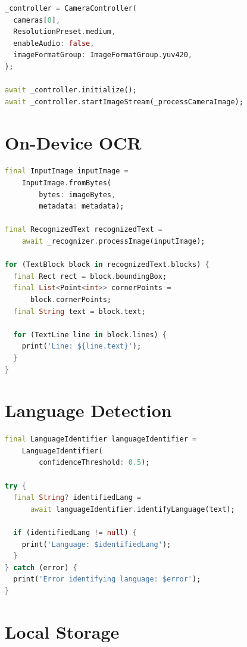 \documentclass[12pt,a4paper]{report}
\begin{document}
\begin{lstlisting}[language=Dart]
_controller = CameraController(
  cameras[0],
  ResolutionPreset.medium,
  enableAudio: false,
  imageFormatGroup: ImageFormatGroup.yuv420,
);

await _controller.initialize();
await _controller.startImageStream(_processCameraImage);
\end{lstlisting}

\section{On-Device OCR}

\begin{lstlisting}[language=Dart]
final InputImage inputImage = 
    InputImage.fromBytes(
        bytes: imageBytes,
        metadata: metadata);

final RecognizedText recognizedText = 
    await _recognizer.processImage(inputImage);

for (TextBlock block in recognizedText.blocks) {
  final Rect rect = block.boundingBox;
  final List<Point<int>> cornerPoints = 
      block.cornerPoints;
  final String text = block.text;
  
  for (TextLine line in block.lines) {
    print('Line: ${line.text}');
  }
}
\end{lstlisting}

\section{Language Detection}

\begin{lstlisting}[language=Dart]
final LanguageIdentifier languageIdentifier = 
    LanguageIdentifier(
        confidenceThreshold: 0.5);

try {
  final String? identifiedLang = 
      await languageIdentifier.identifyLanguage(text);
  
  if (identifiedLang != null) {
    print('Language: $identifiedLang');
  }
} catch (error) {
  print('Error identifying language: $error');
}
\end{lstlisting}

\section{Local Storage}
\end{document}
